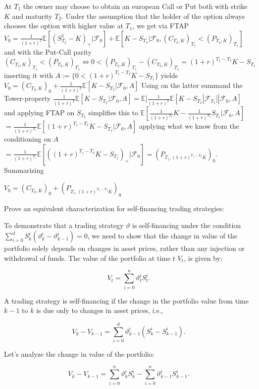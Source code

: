 At \( T_1 \) the owner may choose to obtain an european Call or Put both with strike \( K \) and maturity \( T_2 \).
Under the assumption that the holder of the option always chooses the option with higher value at \( T_1 \), we get
via FTAP
\( V_0 = \frac{1}{(1 + r)^T} \mathbb{E}[(S^1_{T_2} - K)_{+}|\mathcal{F}_0] + \mathbb{E}[K - S_{T_2}|\mathcal{F}_0, (C_{T_2,K})_{T_1} < (P_{T_2,K})_{T_1}] \)
and with the Put-Call parity \( (C_{T_2,K})_{T_1} < (P_{T_2,K})_{T_1} \iff 0 < (P_{T_2,K})_{T_1} - (C_{T_2,K})_{T_1} = (1 + r)^{T_1 - T_2}K - S_{T_1} \)
inserting it with \( A := \{ 0 < (1 + r)^{T_1 - T_2}K - S_{T_1} \} \) yields
\( V_0 = (C_{T_2,K})_{0} + \frac{1}{(1+r)^T}\mathbb{E}[K - S_{T_2}|\mathcal{F}_0, A] \)
Using on the latter summand the Tower-property 
\( \frac{1}{(1+r)^T}\mathbb{E}[K - S_{T_2}|\mathcal{F}_0, A] = \mathbb{E}[\frac{1}{(1+r)^T}\mathbb{E}[K - S_{T_2}|\mathcal{F}_{T_1}]|\mathcal{F}_0, A] \)
and applying FTAP on \( S_{T_2} \) simplifies this to
\( \mathbb{E}[\frac{1}{(1+r)^{T_2}}K - \frac{1}{(1+r)^{T_2}}S_{T_1}|\mathcal{F}_0, A] \)
\( = \frac{1}{(1+r)^{T_1}} \mathbb{E}[(1 + r)^{T_1 - T_2}K - S_{T_1}|\mathcal{F}_0, A] \)
applying what we know from the conditioning on \( A \)
\( = \frac{1}{(1+r)^{T_1}} \mathbb{E}[((1 + r)^{T_1 - T_2}K - S_{T_1})_{+}|\mathcal{F}_0] = (P_{T_1, (1+r)^{T_1 - T_2}K})_0 \).
Summarizing 

\( V_0 = (C_{T_2,K})_{0} + (P_{T_1, (1+r)^{T_1 - T_2}K})_0 \)

Prove an equivalent characterization for self-financing trading strategies:

To demonstrate that a trading strategy \(\vartheta\) is self-financing under the condition \(\sum_{i=0}^d S^i_k(\vartheta^i_k - \vartheta^i_{k-1}) = 0\), we need to show that the change in value of the portfolio solely depends on changes in asset prices, rather than any injection or withdrawal of funds.
The value of the portfolio at time \(t\) \(V_t\), is given by:

\[
V_t = \sum_{i=0}^n \vartheta^i_t S^i_t.
\]

A trading strategy is self-financing if the change in the portfolio value from time \(k-1\) to \(k\) is due only to changes in asset prices, i.e.,

\[
V_k - V_{k-1} = \sum_{i=0}^d \vartheta^i_{k-1} (S^i_k - S^i_{k-1}).
\]

Let's analyze the change in value of the portfolio:

\[
V_k - V_{k-1} = \sum_{i=0}^n \vartheta^i_k S^i_k - \sum_{i=0}^n \vartheta^i_{k-1} S^i_{k-1}.
\]

